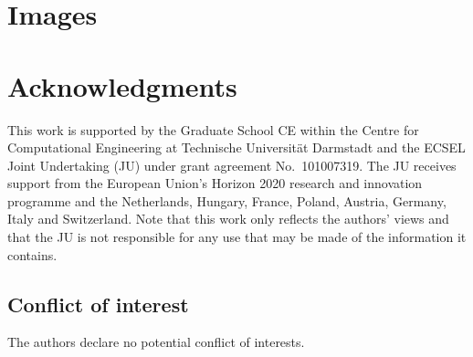 \documentclass[AMA,STIX1COL]{WileyNJD-v2}
\begin{document}
\section{Images}




\section*{Acknowledgments}
This work is supported by the Graduate School CE within the Centre for Computational Engineering at Technische Universit{\"a}t Darmstadt and the ECSEL Joint Undertaking (JU) under grant agreement No.~101007319. The JU receives support from the European Union's Horizon 2020 research and innovation programme and the Netherlands, Hungary, France, Poland, Austria, Germany, Italy and Switzerland. Note that this work only reflects the authors' views and that the JU is not responsible for any use that may be made of the information it contains.



\subsection*{Conflict of interest}
The authors declare no potential conflict of interests.
\end{document}

